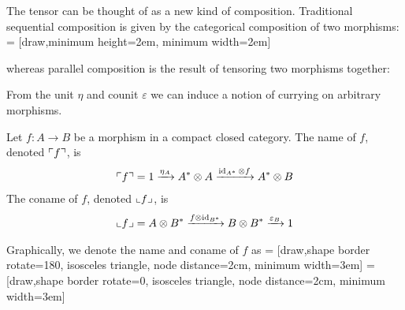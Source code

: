 The tensor can be thought of as a new kind of composition. Traditional
sequential composition is given by the categorical composition of two morphisms:
 = [draw,minimum height=2em, minimum width=2em]
\begin{center}  \end{center}
whereas parallel composition is the result of tensoring two morphisms together:
\begin{center}  \end{center}

From the unit $\eta$ and counit $\varepsilon$ we can induce a notion of currying
on arbitrary morphisms.

\begin{definition}
    Let $f : A \rightarrow B$ be a morphism in a compact closed category. The name of $f$,
    denoted $\ulcorner f \urcorner$, is
    \begin{align*}
        \ulcorner f \urcorner = 1 
         \xrightarrow{\eta_A} A^* \otimes A
         \xrightarrow{\operatorname{id}_{A^*} \otimes f} A^* \otimes B
    \end{align*}
    The coname of $f$, denoted $\llcorner f \lrcorner$, is
    \begin{align*}
        \llcorner f \lrcorner = A \otimes B^*
        \xrightarrow{f \otimes \operatorname{id}_{B^*}} B \otimes B^*
        \xrightarrow{\varepsilon_B} 1
    \end{align*}
\end{definition}
Graphically, we denote the name and coname of $f$ as
 = [draw,shape border rotate=180, 
                        isosceles triangle,
                        node distance=2cm, minimum width=3em]
 = [draw,shape border rotate=0,
                        isosceles triangle,
                        node distance=2cm, minimum width=3em]

